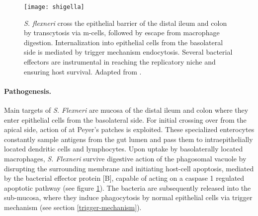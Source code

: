 \begin{figure}
  \centering
  \texttt{[image: shigella]}
  \caption[Route of infection and intracellular life-cycle of \textit{S. flexneri}.]{\textit{S. flexneri} cross the epithelial barrier of the distal ileum and colon by transcytosis via \acrshort{m-cells}, followed by escape from macrophage digestion. Internalization into epithelial cells from the basolateral side is mediated by trigger mechanism endocytosis. Several bacterial effectors are instrumental in reaching the replicatory niche and ensuring host survival. Adapted from \citet{Croxen2010}.}
  \label{fig:shigella}
\end{figure}

\paragraph{Pathogenesis.}
Main targets of \textit{S. Flexneri} are mucosa of the distal ileum and colon where they enter epithelial cells from the basolateral side. For initial crossing over from the apical side, action of  at Peyer's patches is exploited. These specialized enterocytes constantly sample antigens from the gut lumen and pass them to intraepithelially located dendritic cells and lymphocytes. Upon uptake by basolaterally located macrophages, \textit{S. Flexneri} survive digestive action of the phagosomal vacuole by disrupting the surrounding membrane and initiating host-cell apoptosis, mediated by the bacterial effector protein [B], capable of acting on a caspase 1 regulated apoptotic pathway (see figure \ref{fig:shigella}). The bacteria are subsequently released into the sub-mucosa, where they induce phagocytosis by normal epithelial cells via trigger mechanism (see section \ref{trigger-mechanism}).

